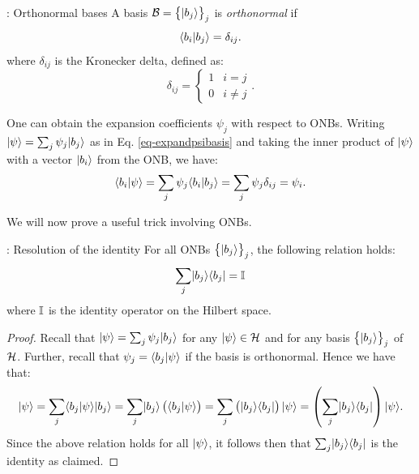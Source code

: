 \begin{defbox}{: Orthonormal bases}\label{def-ONB}
    A basis $\mathcal{B} = \set{\lvert b_j \rangle}_j$ is \emph{orthonormal} if
    \begin{equation}
        \langle b_i \lvert b_j \rangle = \delta_{ij}.
    \end{equation}
    where $\delta_{ij}$ is the Kronecker delta, defined as:
    \begin{equation}
        \delta_{ij} = \begin{cases}
            1 & i = j
            \\ 0 & i \neq j
        \end{cases}.
    \end{equation}

    One can obtain the expansion coefficients $\psi_j$ with respect to ONBs. Writing $\lvert \psi \rangle = \sum_j \psi_j \lvert b_j \rangle$ as in Eq. \eqref{eq-expandpsibasis} and taking the inner product of $\lvert \psi \rangle$ with a vector $\lvert b_i \rangle$ from the ONB, we have:
    \begin{equation}
        \langle b_i \lvert \psi \rangle = \sum_j \psi_j \langle b_i \lvert b_j \rangle = \sum_j \psi_j \delta_{ij} = \psi_i.
    \end{equation}
\end{defbox}

We will now prove a useful trick involving ONBs.

\begin{thmbox}{: Resolution of the identity}\label{thm-residentity}
    For all ONBs $\set{\lvert b_j \rangle}_j$, the following relation holds:
    \begin{equation}
        \sum_j \lvert b_j \rangle \langle b_j \rvert = \mathbb{I}
    \end{equation}
    where $\mathbb{I}$ is the identity operator on the Hilbert space.
\end{thmbox}

\begin{proof}
    Recall that $\lvert \psi \rangle = \sum_j \psi_j \lvert b_j \rangle$ for any $\lvert \psi \rangle \in \mathcal{H}$ and for any basis $\set{\lvert b_j \rangle}_j$ of $\mathcal{H}$. Further, recall that $\psi_j = \langle b_j \lvert \psi \rangle$ if the basis is orthonormal. Hence we have that:
    \begin{equation}
        \lvert \psi \rangle = \sum_j \langle b_j \lvert \psi \rangle\lvert b_j \rangle = \sum_j \lvert b_j \rangle\left(\langle b_j \lvert \psi \rangle\right) = \sum_j \left(\lvert b_j \rangle \langle b_j \rvert\right)\lvert \psi \rangle = \left(\sum_j \lvert b_j \rangle \langle b_j \rvert\right)\lvert \psi \rangle.
    \end{equation}
    Since the above relation holds for all $\lvert \psi \rangle$, it follows then that $\sum_j\lvert b_j \rangle \langle b_j \rvert$ is the identity as claimed.
\end{proof}


